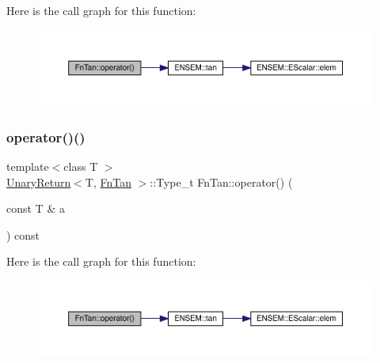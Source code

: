 Here is the call graph for this function\+:
\nopagebreak
\begin{figure}[H]
\begin{center}
\leavevmode
\includegraphics[width=350pt]{d8/dce/structFnTan_a067d849927778152282097f8efe5cdf1_cgraph}
\end{center}
\end{figure}
\mbox{\label{structFnTan_a067d849927778152282097f8efe5cdf1}} 
\subsubsection{\texorpdfstring{operator()()}{operator()()}\hspace{0.1cm}{\footnotesize\ttfamily [2/3]}}
{\footnotesize\ttfamily template$<$class T $>$ \\
\mbox{\hyperlink{structUnaryReturn}{Unary\+Return}}$<$T, \mbox{\hyperlink{structFnTan}{Fn\+Tan}} $>$\+::Type\+\_\+t Fn\+Tan\+::operator() (\begin{DoxyParamCaption}\item[{const T \&}]{a }\end{DoxyParamCaption}) const\hspace{0.3cm}{\ttfamily [inline]}}

Here is the call graph for this function\+:
\nopagebreak
\begin{figure}[H]
\begin{center}
\leavevmode
\includegraphics[width=350pt]{d8/dce/structFnTan_a067d849927778152282097f8efe5cdf1_cgraph}
\end{center}
\end{figure}
\mbox{\label{structFnTan_a067d849927778152282097f8efe5cdf1}} 
